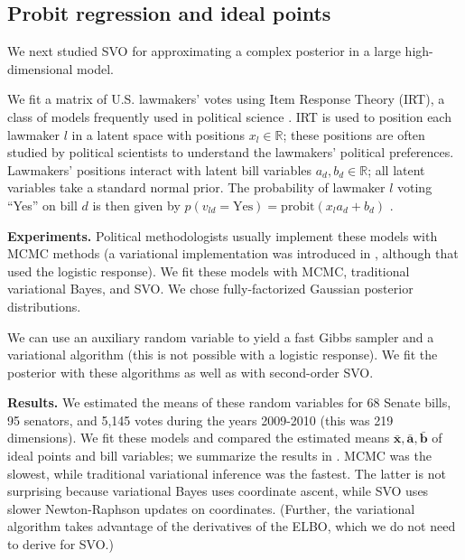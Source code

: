 \subsection{Probit regression and ideal points}
\label{section:probit_regression}
We next studied SVO for approximating a complex posterior in a large
high-dimensional model.

We fit a matrix of U.S. lawmakers' votes using Item Response Theory
(IRT), a class of models frequently used in political science
\cite{poole:1991,martin:2002,albert:1992}.  IRT is used to position
each lawmaker $l$ in a latent space with positions $x_l \in
\mathbb{R}$; these positions are often studied by political scientists
to understand the lawmakers' political preferences.  Lawmakers'
positions interact with latent bill variables $a_d, b_d \in
\mathbb{R}$; all latent variables take a standard normal prior.  The
probability of lawmaker $l$ voting ``Yes'' on bill $d$ is then given
by $p(v_{ld} = \mbox{Yes}) = \mbox{probit}(x_l a_d + b_d)$
\cite{clinton:2004}.

\textbf{Experiments.}  Political methodologists usually implement
these models with MCMC methods \cite{albert:1992} (a variational
implementation was introduced in \cite{gerrish:2011}, although that
used the logistic response). We fit these models with MCMC,
traditional variational Bayes, and SVO.  We chose fully-factorized
Gaussian posterior distributions.

We can use an auxiliary random variable to yield a fast Gibbs sampler
and a variational algorithm \cite{armagan:2011} (this is not possible
with a logistic response).  We fit the posterior with these algorithms
as well as with second-order SVO.

\textbf{Results.} We estimated the means of these random variables for
68 Senate bills, 95 senators, and 5,145 votes during the years
2009-2010 (this was 219 dimensions).  We fit these models and compared
the estimated means $\bm \bar x, \bm \bar a, \bm \bar b$ of ideal
points and bill variables; we summarize the results in
.  MCMC was the slowest, while traditional
variational inference was the fastest.  The latter is not surprising
because variational Bayes uses coordinate ascent, while SVO uses
slower Newton-Raphson updates on coordinates.  (Further, the
variational algorithm takes advantage of the derivatives of the ELBO,
which we do not need to derive for SVO.)

